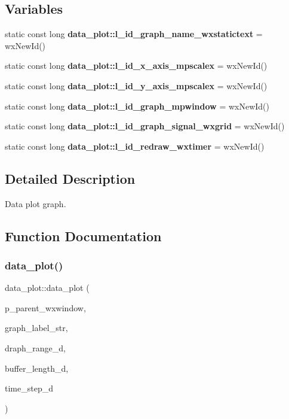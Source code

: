 \subsection*{Variables}
\begin{DoxyCompactItemize}
\item 
static const long \textbf{ data\+\_\+plot\+::l\+\_\+id\+\_\+graph\+\_\+name\+\_\+wxstatictext} = wx\+New\+Id()
\item 
\mbox{\label{group___data__plot_ga3221fafb0dff8db543c64617a5813420}} 
static const long {\bfseries data\+\_\+plot\+::l\+\_\+id\+\_\+x\+\_\+axis\+\_\+mpscalex} = wx\+New\+Id()
\item 
\mbox{\label{group___data__plot_ga28dfe100cdff22521b0858f374b0d66a}} 
static const long {\bfseries data\+\_\+plot\+::l\+\_\+id\+\_\+y\+\_\+axis\+\_\+mpscalex} = wx\+New\+Id()
\item 
\mbox{\label{group___data__plot_ga365c13faddce7c875fac99ba8cc4c5d6}} 
static const long {\bfseries data\+\_\+plot\+::l\+\_\+id\+\_\+graph\+\_\+mpwindow} = wx\+New\+Id()
\item 
\mbox{\label{group___data__plot_ga4fb1d490b462386ed1250e4ff2b9126b}} 
static const long {\bfseries data\+\_\+plot\+::l\+\_\+id\+\_\+graph\+\_\+signal\+\_\+wxgrid} = wx\+New\+Id()
\item 
\mbox{\label{group___data__plot_gac5653f0cbd7b20caaf0f7715ba09ed00}} 
static const long {\bfseries data\+\_\+plot\+::l\+\_\+id\+\_\+redraw\+\_\+wxtimer} = wx\+New\+Id()
\end{DoxyCompactItemize}


\subsection{Detailed Description}
Data plot graph. 



\subsection{Function Documentation}
\mbox{\label{group___data__plot_ga7c7ca4e7c747f066ea273500041f67cf}} 
\subsubsection{data\_plot()}
{\footnotesize\ttfamily data\+\_\+plot\+::data\+\_\+plot (\begin{DoxyParamCaption}\item[{wx\+Window $\ast$}]{p\+\_\+parent\+\_\+wxwindow,  }\item[{wx\+String}]{graph\+\_\+label\+\_\+str,  }\item[{double}]{draph\+\_\+range\+\_\+d,  }\item[{double}]{buffer\+\_\+length\+\_\+d,  }\item[{double}]{time\+\_\+step\+\_\+d }\end{DoxyParamCaption})}



